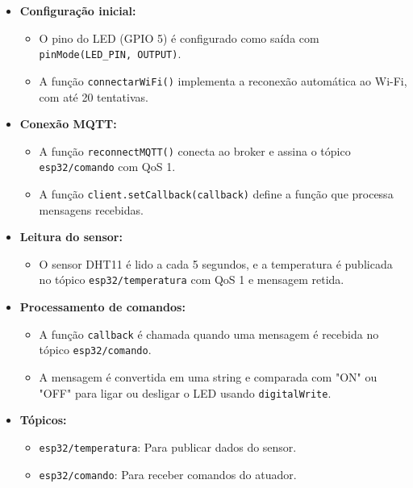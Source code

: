 \documentclass[a4paper]{article}
\begin{document}
\begin{answer}
\begin{enumerate}
                \begin{itemize}
                    \item \textbf{Configuração inicial:}
                    \begin{itemize}
                        \item O pino do LED (GPIO 5) é configurado como saída com \texttt{pinMode(LED\_PIN, OUTPUT)}.
                        \item A função \texttt{connectarWiFi()} implementa a reconexão automática ao Wi-Fi, com até 20 tentativas.
                    \end{itemize}
                    \item \textbf{Conexão MQTT:}
                    \begin{itemize}
                        \item A função \texttt{reconnectMQTT()} conecta ao broker e assina o tópico \texttt{esp32/comando} com QoS 1.
                        \item A função \texttt{client.setCallback(callback)} define a função que processa mensagens recebidas.
                    \end{itemize}
                    \item \textbf{Leitura do sensor:}
                    \begin{itemize}
                        \item O sensor DHT11 é lido a cada 5 segundos, e a temperatura é publicada no tópico \texttt{esp32/temperatura} com QoS 1 e mensagem retida.
                    \end{itemize}
                    \item \textbf{Processamento de comandos:}
                    \begin{itemize}
                        \item A função \texttt{callback} é chamada quando uma mensagem é recebida no tópico \texttt{esp32/comando}.
                        \item A mensagem é convertida em uma string e comparada com "ON" ou "OFF" para ligar ou desligar o LED usando \texttt{digitalWrite}.
                    \end{itemize}
                    \item \textbf{Tópicos:}
                    \begin{itemize}
                        \item \texttt{esp32/temperatura}: Para publicar dados do sensor.
                        \item \texttt{esp32/comando}: Para receber comandos do atuador.
                    \end{itemize}
                \end{itemize}


\end{enumerate}
\end{answer}
\end{document}

